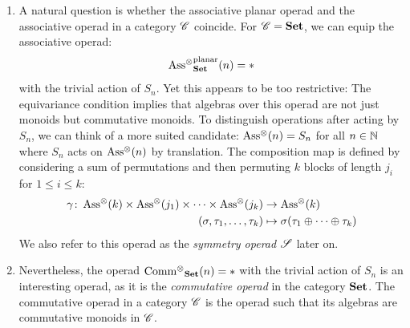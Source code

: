     \begin{egs}
        \begin{enumerate} \label{eg:operads}
            \item A natural question is whether the associative planar operad
            and the associative operad in a category $\C$ coincide.
            For $\C = \Set$, we can equip the associative operad:
            $$\Ass_{\Set}^{\text{planar}}(n) = \ast$$ with the trivial action of
            $S_n$. Yet this appears to be too restrictive: The equivariance
            condition implies that algebras over this operad are not just
            monoids but commutative monoids. To distinguish operations after
            acting by $S_n$, we can think of a more suited candidate:
            $\Ass(n)=S_n$ for all $n \in \N$ where $S_n$ acts on $\Ass(n)$ by
            translation. The composition map is defined by considering a sum of
            permutations and then permuting $k$ blocks of length $j_i$ for $1
            \leq i \leq k$: 
            \begin{align*}
                \gamma \colon \Ass(k) \times \Ass(j_1) 
                \times \dots \times \Ass(j_k) & \to \Ass(k)\\
                (\sigma, \tau_1, \dots, \tau_k) & \mapsto \sigma(\tau_1 \oplus \dots \oplus \tau_k)
            \end{align*}
            We also refer to this operad as the \emph{symmetry operad} $\S$
            later on.
            
            \item Nevertheless, the operad $\Comm_{\Set}(n) = \ast$ with the
            trivial action of $S_n$ is an interesting operad, as it is the {\em
            commutative operad} in the category $\Set$. The commutative operad
            in a category $\C$ is the operad such that its algebras are
            commutative monoids in $\C$. 
            

\end{enumerate}
\end{egs}
